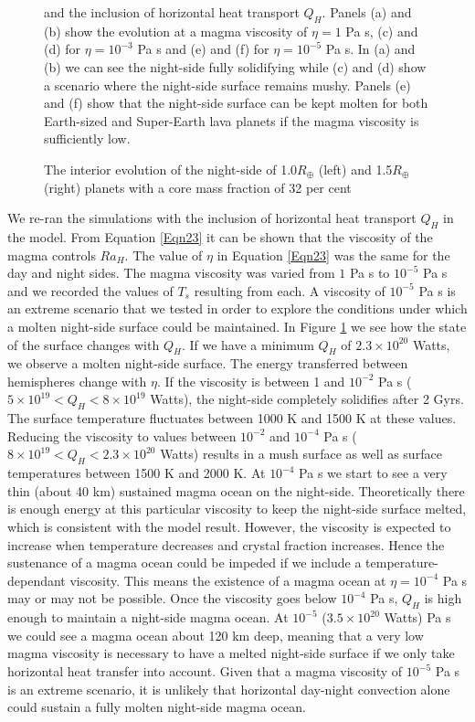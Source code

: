 \documentclass[fleqn,usenatbib]{mnras}
\begin{document}
\begin{figure}
\caption{The interior evolution of the night-side of 1.0$R_{\oplus}$ (left) and 1.5$R_{\oplus}$ (right) planets with a core mass fraction of 32 per cent} and the inclusion of horizontal heat transport $Q_{H}$. Panels (a) and (b) show the evolution at a magma viscosity of $\eta = 1$ Pa s, (c) and (d) for $\eta = 10^{-3}$ Pa s and (e) and (f) for $\eta = 10^{-5}$ Pa s. In (a) and (b) we can see the night-side fully solidifying while (c) and (d) show a scenario where the night-side surface remains mushy. Panels (e) and (f) show that the night-side surface can be kept molten for both Earth-sized and Super-Earth lava planets if the magma viscosity is sufficiently low.
\label{fig3}
\end{figure}

We re-ran the simulations with the inclusion of horizontal heat transport $Q_{H}$ in the model. From Equation \ref{Eqn23} it can be shown that the viscosity of the magma controls $Ra_{H}$. The value of $\eta$ in Equation \ref{Eqn23} was the same for the day and night sides. The magma viscosity was varied from $1$ Pa s to $10^{-5}$ Pa s and we recorded the values of $T_{s}$ resulting from each. A viscosity of $10^{-5}$ Pa s is an extreme scenario that we tested in order to explore the conditions under which a molten night-side surface could be maintained. In Figure \ref{fig3} we see how the state of the surface changes with $Q_{H}$. If we have a minimum $Q_{H}$ of $2.3 \times 10^{20}$ Watts, we observe a molten night-side surface. The energy transferred between hemispheres change with $\eta$. If the viscosity is between 1 and $10^{-2}$ Pa s ($5 \times 10^{19} < Q_{H} < 8 \times 10^{19}$ Watts), the night-side completely solidifies after 2 Gyrs. The surface temperature fluctuates between 1000 K and 1500 K at these values. Reducing the viscosity to values between $10^{-2}$ and $10^{-4}$ Pa s ($8 \times 10^{19} < Q_{H} < 2.3 \times 10^{20}$ Watts) results in a mush surface as well as surface temperatures between 1500 K and 2000 K. At $10^{-4}$ Pa s we start to see a very thin (about 40 km) sustained magma ocean on the night-side. Theoretically there is enough energy at this particular viscosity to keep the night-side surface melted, which is consistent with the model result. However, the viscosity is expected to increase when temperature decreases and crystal fraction increases. Hence the sustenance of a magma ocean could be impeded if we include a temperature-dependant viscosity. This means the existence of a magma ocean at $\eta = 10^{-4}$ Pa s may or may not be possible. Once the viscosity goes below $10^{-4}$ Pa s, $Q_{H}$ is high enough to maintain a night-side magma ocean. At $10^{-5}$ ($3.5 \times 10^{20}$ Watts) Pa s we could see a magma ocean about 120 km deep, meaning that a very low magma viscosity is necessary to have a melted night-side surface if we only take horizontal heat transfer into account. Given that a magma viscosity of $10^{-5}$ Pa s is an extreme scenario, it is unlikely that horizontal day-night convection alone could sustain a fully molten night-side magma ocean.   
\end{document}
